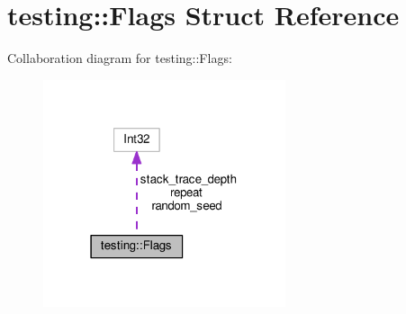 \hypertarget{structtesting_1_1_flags}{}\section{testing\+:\+:Flags Struct Reference}
\label{structtesting_1_1_flags}


Collaboration diagram for testing\+:\+:Flags\+:
\nopagebreak
\begin{figure}[H]
\begin{center}
\leavevmode
\includegraphics[width=202pt]{structtesting_1_1_flags__coll__graph}
\end{center}
\end{figure}
